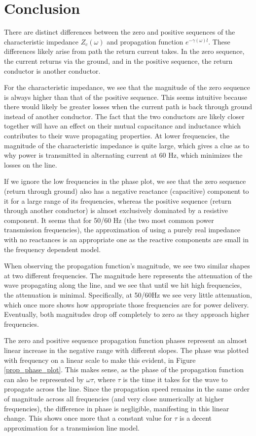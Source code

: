 \documentclass[10pt, oneside, letterpaper]{article}
\begin{document}
\newpage
\section{Conclusion}

There are distinct differences between the zero and positive sequences of the characteristic impedance $Z_c(\omega{})$ and propagation function $e^{-\gamma{}(\omega{})l}$. These differences likely arise from path the return current takes. In the zero sequence, the current returns via the ground, and in the positive sequence, the return conductor is another conductor.

For the characteristic impedance, we see that the magnitude of the zero sequence is always higher than that of the positive sequence. This seems intuitive because there would likely be greater losses when the current path is back through ground instead of another conductor. The fact that the two conductors are likely closer together will have an effect on their mutual capacitance and inductance which contributes to their wave propagating properties. At lower frequencies, the magnitude of the characteristic impedance is quite large, which gives a clue as to why power is transmitted in alternating current at 60 Hz, which minimizes the losses on the line.

If we ignore the low frequencies in the phase plot, we see that the zero sequence (return through ground) also has a negative reactance (capacitive) component to it for a large range of its frequencies, whereas the positive sequence (return through another conductor) is almost exclusively dominated by a resistive component. It seems that for 50/60 Hz (the two most common power transmission frequencies), the approximation of using a purely real impedance with no reactances is an appropriate one as the reactive components are small in the frequency dependent model.

When observing the propagation function's magnitude, we see two similar shapes at two different frequencies. The magnitude here represents the attenuation of the wave propagating along the line, and we see that until we hit high frequencies, the attenuation is minimal. Specifically, at 50/60Hz we see very little attenuation, which once more shows how appropriate those frequencies are for power delivery. Eventually, both magnitudes drop off completely to zero as they approach higher frequencies.

The zero and positive sequence propagation function phases represent an almost linear increase in the negative range with different slopes. The phase was plotted with frequency on a linear scale to make this evident, in Figure \ref{prop_phase_plot}. This makes sense, as the phase of the propagation function can also be represented by $\omega{}\tau{}$, where $\tau{}$ is the time it takes for the wave to propagate across the line. Since the propagation speed remains in the same order of magnitude across all frequencies (and very close numerically at higher frequencies), the difference in phase is negligible, manifesting in this linear change. This shows once more that a constant value for $\tau{}$ is a decent approximation for a transmission line model.
\end{document}
